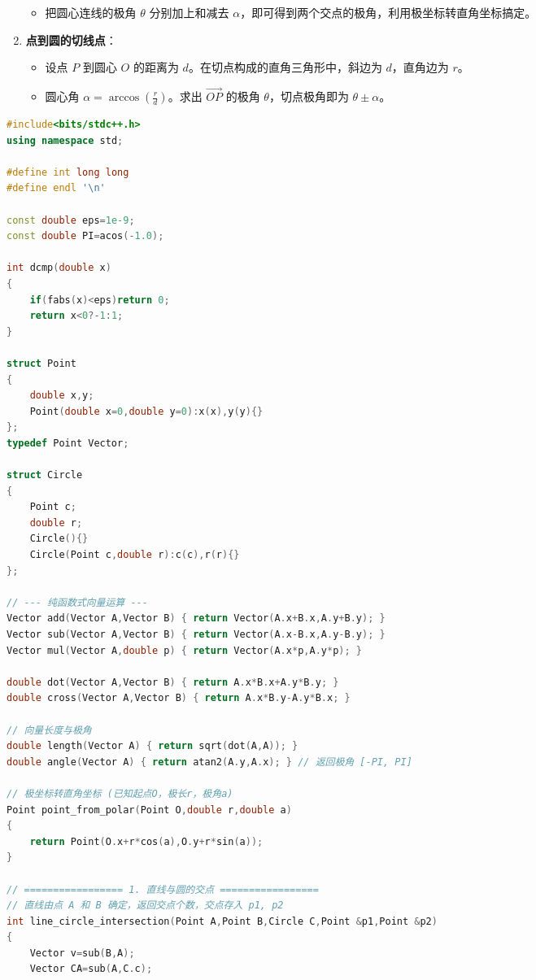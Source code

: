 \documentclass[10pt,landscape,a4paper]{article}
\begin{document}
\begin{multicols*}{3}
\begin{enumerate}[start=1]
\begin{itemize}
\item 把圆心连线的极角 $\theta$ 分别加上和减去 $\alpha$，即可得到两个交点的极角，利用极坐标转直角坐标搞定。
\end{itemize}
\item \textbf{点到圆的切线点}：
\begin{itemize}
\item 设点 $P$ 到圆心 $O$ 的距离为 $d$。在切点构成的直角三角形中，斜边为 $d$，直角边为 $r$。
\item 圆心角 $\alpha = \arccos(\frac{r}{d})$。求出 $\overrightarrow{OP}$ 的极角 $\theta$，切点极角即为 $\theta \pm \alpha$。
\end{itemize}
\end{enumerate}
\par{}\par
\begin{lstlisting}[language=C++]
#include<bits/stdc++.h>
using namespace std;

#define int long long
#define endl '\n'

const double eps=1e-9;
const double PI=acos(-1.0);

int dcmp(double x)
{
    if(fabs(x)<eps)return 0;
    return x<0?-1:1;
}

struct Point
{
    double x,y;
    Point(double x=0,double y=0):x(x),y(y){}
};
typedef Point Vector;

struct Circle
{
    Point c;
    double r;
    Circle(){}
    Circle(Point c,double r):c(c),r(r){}
};

// --- 纯函数式向量运算 ---
Vector add(Vector A,Vector B) { return Vector(A.x+B.x,A.y+B.y); }
Vector sub(Vector A,Vector B) { return Vector(A.x-B.x,A.y-B.y); }
Vector mul(Vector A,double p) { return Vector(A.x*p,A.y*p); }

double dot(Vector A,Vector B) { return A.x*B.x+A.y*B.y; }
double cross(Vector A,Vector B) { return A.x*B.y-A.y*B.x; }

// 向量长度与极角
double length(Vector A) { return sqrt(dot(A,A)); }
double angle(Vector A) { return atan2(A.y,A.x); } // 返回极角 [-PI, PI]

// 极坐标转直角坐标 (已知起点O，极长r，极角a)
Point point_from_polar(Point O,double r,double a)
{
    return Point(O.x+r*cos(a),O.y+r*sin(a));
}

// ================= 1. 直线与圆的交点 =================
// 直线由点 A 和 B 确定，返回交点个数，交点存入 p1, p2
int line_circle_intersection(Point A,Point B,Circle C,Point &p1,Point &p2)
{
    Vector v=sub(B,A);
    Vector CA=sub(A,C.c);
    

\end{lstlisting}
\end{multicols*}
\end{document}
